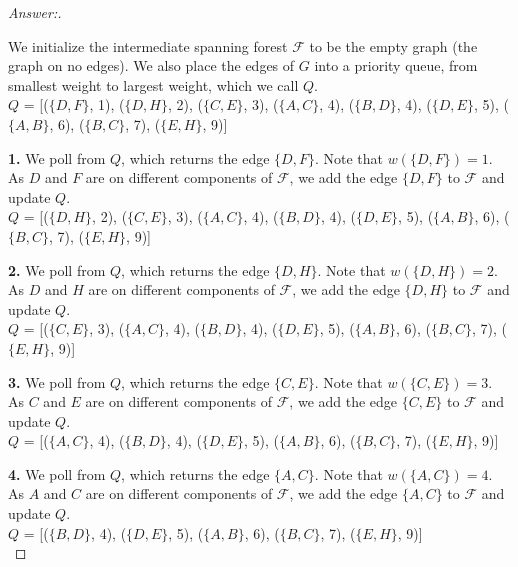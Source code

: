 \documentclass[11pt]{article}
\theoremstyle{definition}
\theoremstyle{definition}
\theoremstyle{definition}
\begin{document}
\begin{proof}[Answer:] \

\item We initialize the intermediate spanning forest $\mathcal{F}$ to be the empty graph (the graph on no edges). We also place the edges of $G$ into a priority queue, from smallest weight to largest weight, which we call $Q$. \\
$Q$ = [($\{D, F\}$, 1), ($\{D, H\}$, 2), ($\{C, E\}$, 3), ($\{A, C\}$, 4), ($\{B, D\}$, 4), ($\{D, E\}$, 5), ($\{A, B\}$, 6), ($\{B, C\}$, 7), ($\{E, H\}$, 9)] \\

\item \textbf{1.} We poll from $Q$, which returns the edge $\{D, F\}$. Note that $w(\{D, F\}) = 1$. As $D$ and $F$ are on different components of $\mathcal{F}$, we add the edge $\{D, F\}$ to $\mathcal{F}$ and update $Q$. \\
$Q$ = [($\{D, H\}$, 2), ($\{C, E\}$, 3), ($\{A, C\}$, 4), ($\{B, D\}$, 4), ($\{D, E\}$, 5), ($\{A, B\}$, 6), ($\{B, C\}$, 7), ($\{E, H\}$, 9)] \\

\item \textbf{2.} We poll from $Q$, which returns the edge $\{D, H\}$. Note that $w(\{D, H\}) = 2$. As $D$ and $H$ are on different components of $\mathcal{F}$, we add the edge $\{D, H\}$ to $\mathcal{F}$ and update $Q$. \\
$Q$ = [($\{C, E\}$, 3), ($\{A, C\}$, 4), ($\{B, D\}$, 4), ($\{D, E\}$, 5), ($\{A, B\}$, 6), ($\{B, C\}$, 7), ($\{E, H\}$, 9)] \\

\item \textbf{3.} We poll from $Q$, which returns the edge $\{C, E\}$. Note that $w(\{C, E\}) = 3$. As $C$ and $E$ are on different components of $\mathcal{F}$, we add the edge $\{C, E\}$ to $\mathcal{F}$ and update $Q$. \\
$Q$ = [($\{A, C\}$, 4), ($\{B, D\}$, 4), ($\{D, E\}$, 5), ($\{A, B\}$, 6), ($\{B, C\}$, 7), ($\{E, H\}$, 9)] \\

\item \textbf{4.} We poll from $Q$, which returns the edge $\{A, C\}$. Note that $w(\{A, C\}) = 4$. As $A$ and $C$ are on different components of $\mathcal{F}$, we add the edge $\{A, C\}$ to $\mathcal{F}$ and update $Q$. \\
$Q$ = [($\{B, D\}$, 4), ($\{D, E\}$, 5), ($\{A, B\}$, 6), ($\{B, C\}$, 7), ($\{E, H\}$, 9)] \\


\end{proof}
\end{document}
